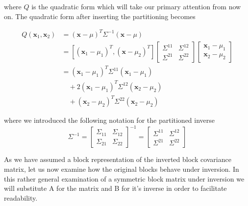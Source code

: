 \documentclass{article}
\begin{document}
where $Q$ is the quadratic form which will take our primary attention from now on. The quadratic form after inserting the partitioning becomes

$$
\begin{aligned}
Q\left(\mathbf{x}_{1}, \mathbf{x}_{2}\right) &=(\mathbf{x}-\mu)^{T} \Sigma^{-1}(\mathbf{x}-\mu) \\
&=\left[\left(\mathbf{x}_{1}-\mu_{1}\right)^{T},\left(\mathbf{x}-\mu_{2}\right)^{T}\right] \left[ \begin{array}{cc}{\Sigma^{11}} & {\Sigma^{12}} \\ {\Sigma^{21}} & {\Sigma^{22}}\end{array}\right] \left[ \begin{array}{l}{\mathbf{x}_{1}-\mu_{1}} \\ {\mathbf{x}_{2}-\mu_{2}}\end{array}\right]\\
&=\left(\mathbf{x}_{1}-\mu_{1}\right)^{T} \Sigma^{11}\left(\mathbf{x}_{1}-\mu_{1}\right)\\
&\quad+2\left(\mathbf{x}_{1}-\mu_{1}\right)^{T} \Sigma^{12}\left(\mathbf{x}_{2}-\mu_{2}\right)\\
&\quad+\left(\mathbf{x}_{2}-\mu_{2}\right)^{T} \Sigma^{22}\left(\mathbf{x}_{2}-\mu_{2}\right) 
\end{aligned}
$$

where we introduced the following notation for the partitioned inverse
$$
\Sigma^{-1}=\left[ \begin{array}{cc}{\Sigma_{11}} & {\Sigma_{12}} \\ {\Sigma_{21}} & {\Sigma_{22}}\end{array}\right]^{-1}=\left[ \begin{array}{cc}{\Sigma^{11}} & {\Sigma^{12}} \\ {\Sigma^{21}} & {\Sigma^{22}}\end{array}\right]
$$

As we have assumed a block representation of the inverted block covariance matrix, let us now examine how the original blocks behave under inversion. In this rather general examination of a symmetric block matrix under inversion we will substitute A for the matrix and B for it's inverse in order to facilitate readability.
\end{document}
